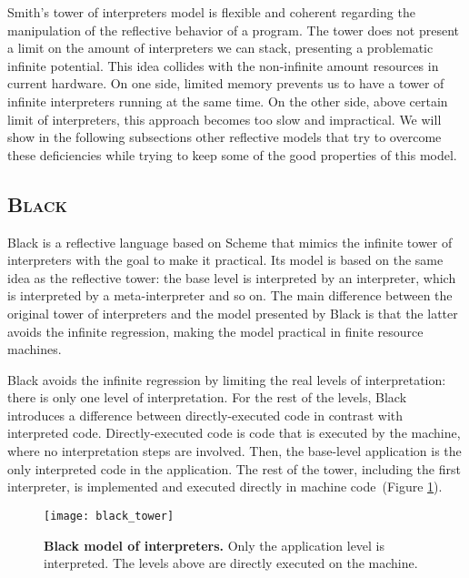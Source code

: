Smith's tower of interpreters model is flexible and coherent regarding the manipulation of the reflective behavior of a program. The tower does not present a limit on the amount of interpreters we can stack, presenting a problematic infinite potential. This idea collides with the non-infinite amount resources in current hardware. On one side, limited memory prevents us to have a tower of infinite interpreters running at the same time. On the other side, above certain limit of interpreters, this approach becomes too slow and impractical. We will show in the following subsections other reflective models that try to overcome these deficiencies while trying to keep some of the good properties of this model.

\subsection*{\textsc{Black}}

Black is a reflective language based on Scheme that mimics the infinite tower of interpreters with the goal to make it practical. Its model is based on the same idea as the reflective tower: the base level is interpreted by an interpreter, which is interpreted by a meta-interpreter and so on. The main difference between the original tower of interpreters and the model presented by Black is that the latter avoids the infinite regression, making the model practical in finite resource machines.

Black avoids the infinite regression by limiting the real levels of interpretation: there is only one level of interpretation. For the rest of the levels, Black  introduces a difference between directly-executed code in contrast with interpreted code. Directly-executed code is code that is executed by the machine, where no interpretation steps are involved. Then, the base-level application is the only interpreted code in the application. The rest of the tower, including the first interpreter, is implemented and executed directly in machine code~(Figure \ref{fig:black_tower}).

\begin{figure}[ht]
\begin{center}
\texttt{[image: black\_tower]}
\caption{\textbf{Black model of interpreters.} Only the application level is interpreted. The levels above are directly executed on the machine.\label{fig:black_tower}
 }
\end{center}
\end{figure}

